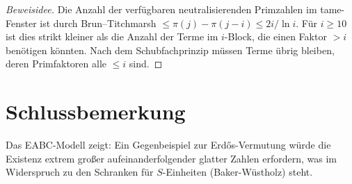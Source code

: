 \documentclass[12pt,a4paper]{article}
\theoremstyle{plain}
\theoremstyle{definition}
\theoremstyle{remark}
\begin{document}
	\begin{proof}[Beweisidee]
		Die Anzahl der verfügbaren neutralisierenden Primzahlen im tame-Fenster ist durch Brun--Titchmarsh $\le \pi(j)-\pi(j-i) \le 2i/\ln i$. Für $i \ge 10$ ist dies strikt kleiner als die Anzahl der Terme im $i$-Block, die einen Faktor $>i$ benötigen könnten. Nach dem Schubfachprinzip müssen Terme übrig bleiben, deren Primfaktoren alle $\le i$ sind.
	\end{proof}
	
	\section{Schlussbemerkung}
	
	Das EABC-Modell zeigt: Ein Gegenbeispiel zur Erdős-Vermutung würde die Existenz extrem großer aufeinanderfolgender glatter Zahlen erfordern, was im Widerspruch zu den Schranken für $S$-Einheiten (Baker-Wüstholz) steht.
	
\end{document}
